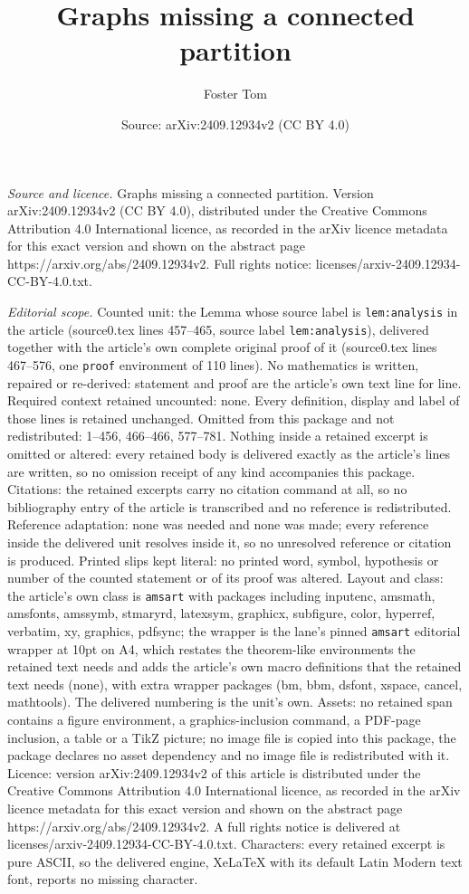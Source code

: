 \documentclass[10pt,a4paper]{amsart}
\title[Graphs missing a connected partition]{Graphs missing a connected partition}
\author{Foster Tom}
\date{Source: arXiv:2409.12934v2 (CC BY 4.0)}
\begin{document}
\maketitle

\noindent\emph{Source and licence.} Graphs missing a connected partition. Version arXiv:2409.12934v2 (CC BY 4.0), distributed under the Creative Commons Attribution 4.0 International licence, as recorded in the arXiv licence metadata for this exact version and shown on the abstract page https://arxiv.org/abs/2409.12934v2. Full rights notice: licenses/arxiv-2409.12934-CC-BY-4.0.txt.\par\smallskip

\noindent\textit{Editorial scope.} Counted unit: the Lemma whose source label is \texttt{lem:analysis} in the article (source0.tex lines 457--465, source label \texttt{lem:analysis}), delivered together with the article's own complete original proof of it (source0.tex lines 467--576, one \texttt{proof} environment of 110 lines). No mathematics is written, repaired or re-derived: statement and proof are the article's own text line for line. Required context retained uncounted: none. Every definition, display and label of those lines is retained unchanged. Omitted from this package and not redistributed: 1--456, 466--466, 577--781. Nothing inside a retained excerpt is omitted or altered: every retained body is delivered exactly as the article's lines are written, so no omission receipt of any kind accompanies this package. Citations: the retained excerpts carry no citation command at all, so no bibliography entry of the article is transcribed and no reference is redistributed. Reference adaptation: none was needed and none was made; every reference inside the delivered unit resolves inside it, so no unresolved reference or citation is produced. Printed slips kept literal: no printed word, symbol, hypothesis or number of the counted statement or of its proof was altered. Layout and class: the article's own class is \texttt{amsart} with packages including inputenc, amsmath, amsfonts, amssymb, stmaryrd, latexsym, graphicx, subfigure, color, hyperref, verbatim, xy, graphics, pdfsync; the wrapper is the lane's pinned \texttt{amsart} editorial wrapper at 10pt on A4, which restates the theorem-like environments the retained text needs and adds the article's own macro definitions that the retained text needs (none), with extra wrapper packages (bm, bbm, dsfont, xspace, cancel, mathtools). The delivered numbering is the unit's own. Assets: no retained span contains a figure environment, a graphics-inclusion command, a PDF-page inclusion, a table or a TikZ picture; no image file is copied into this package, the package declares no asset dependency and no image file is redistributed with it. Licence: version arXiv:2409.12934v2 of this article is distributed under the Creative Commons Attribution 4.0 International licence, as recorded in the arXiv licence metadata for this exact version and shown on the abstract page https://arxiv.org/abs/2409.12934v2. A full rights notice is delivered at licenses/arxiv-2409.12934-CC-BY-4.0.txt. Characters: every retained excerpt is pure ASCII, so the delivered engine, XeLaTeX with its default Latin Modern text font, reports no missing character.
\end{document}
